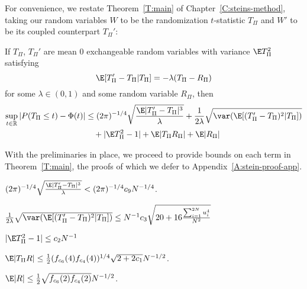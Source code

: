 For convenience, we restate Theorem~\ref{T:main} of
Chapter~\ref{C:steins-method}, taking our random variables $W$ to be
the randomization $t$-statistic $T_{\Pi}$ and $W'$ to be its coupled
counterpart $T_{\Pi}'$:
\begin{thma}
  If $T_{\Pi}$, $T_{\Pi}'$ are mean 0 exchangeable random variables with variance $\E T_{\Pi}^2$
  satisfying
  \begin{equation*}
    \E[T_{\Pi}'-T_{\Pi}|T_{\Pi}] = -\lambda(T_{\Pi}-R_{\Pi})
  \end{equation*}
  for some $\lambda \in (0,1)$ and some random variable $R_{\Pi}$, then
  \begin{equation*}
    \begin{split}
      \sup_{t \in \mathbb{R}} |P(T_{\Pi} \leq t) - \Phi(t)|
      &\leq (2\pi)^{-1/4} \sqrt{\frac{\E |T_{\Pi}'-T_{\Pi}|^3}{\lambda}}
      + \frac{1}{2\lambda} \sqrt{\var (\E [(T_{\Pi}'-T_{\Pi})^2|T_{\Pi}])} \\
      &\quad + |\E T_{\Pi}^2 - 1| + \E |T_{\Pi}R_{\Pi}| + \E |R_{\Pi}|
    \end{split}
  \end{equation*}
\end{thma}

With the preliminaries in place, we proceed to provide bounds on each
term in Theorem~\ref{T:main}, the proofs of which we defer to Appendix~\ref{A:stein-proof-app}.

\begin{proposition}
  \label{P:P3}
  $(2\pi)^{-1/4}\sqrt{\frac{\E|T_{\Pi}'-T_{\Pi}|^3}{\lambda}}
  < (2\pi)^{-1/4} c_9 N^{-1/4}$.
\end{proposition}

\begin{proposition}
  \label{P:P2}
  $\frac{1}{2\lambda} \sqrt{\var (\E [(T_{\Pi}'-T_{\Pi})^2|T_{\Pi}])} \leq
  N^{-1} c_3\sqrt{20 + 16\frac{\sum_{i=1}^{2N} u_{i}^4}{N^2}}$
\end{proposition}

\begin{proposition}
  \label{P:P1}
  $|\E T_{\Pi}^2 -1| \leq c_2 N^{-1}$
\end{proposition}

\begin{proposition}
  \label{P:P5}
  $\E|T_{\Pi}R|
  \leq \frac{1}{2}(f_{c_6}(4)f_{c_4}(4))^{1/4} \sqrt{2+2c_1} N^{-1/2}$.
\end{proposition}

\begin{proposition}
  \label{P:P4}
  $\E|R|
  \leq \frac{1}{2}\sqrt{f_{c_6}(2)f_{c_4}(2)} N^{-1/2}$.
\end{proposition}

